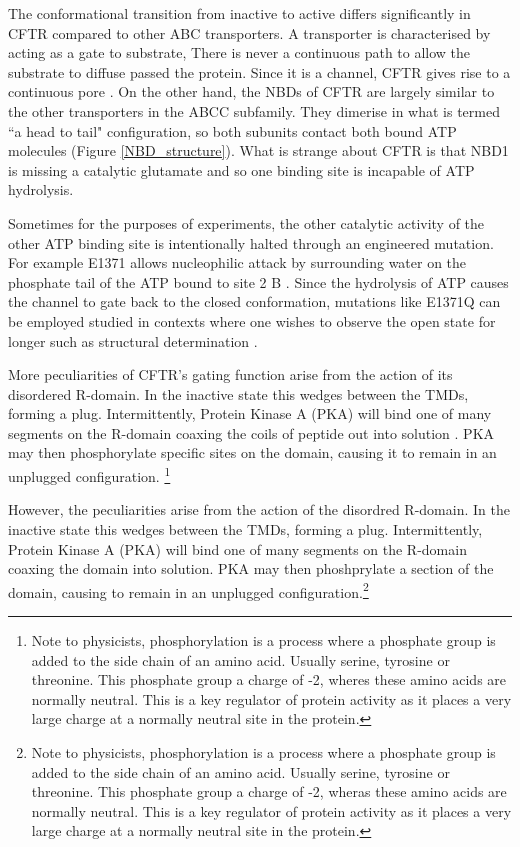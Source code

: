 The conformational transition from inactive to active differs significantly in CFTR compared to other ABC transporters. A transporter is characterised by acting as a gate to substrate, There is never a continuous path to allow the substrate to diffuse passed the protein. Since it is a channel, CFTR gives rise to a continuous pore \cite{linsdell2018}. On the  other hand, the NBDs of CFTR are largely similar to the other transporters in the ABCC subfamily. They dimerise in what is termed ``a head to tail" configuration, so both subunits contact both bound ATP molecules \cite{gout2012}  (Figure \ref{NBD_structure}). What is strange about CFTR is that NBD1 is missing a catalytic glutamate and so one binding site is incapable of ATP hydrolysis. 

Sometimes for the purposes of experiments, the other catalytic activity of the other ATP binding site is intentionally halted through an engineered mutation. For example E1371 allows nucleophilic attack by surrounding water on the phosphate tail of the ATP bound to site 2 B \cite{stratford2007}. Since the hydrolysis of ATP causes the channel to gate back to the closed conformation, mutations like E1371Q can be employed studied in contexts where one wishes to observe the open state for longer such as structural determination \cite{ramjeesingh1999, gout2012, muallem2009, hwang2013, zhang2018}. 

More peculiarities of CFTR's gating function arise from the action of its disordered R-domain. In the inactive state this wedges between the TMDs, forming a plug. Intermittently, Protein Kinase A (PKA) will bind one of many segments on the R-domain coaxing the coils of peptide out into solution \cite{mihalyi2020}. PKA may then phosphorylate specific sites on the domain, causing it to remain in an unplugged configuration. \footnote{Note to physicists, phosphorylation is a process where a phosphate group is added to the side chain of an amino acid. Usually serine, tyrosine or threonine. This phosphate group a charge of -2, wheres these amino acids are normally neutral. This is a key regulator of protein activity as it places a very large charge at a normally neutral site in the protein.}

However, the peculiarities arise from the action of the disordred R-domain. In the inactive state this wedges between the TMDs, forming a plug. Intermittently, Protein Kinase A (PKA) will bind one of many segments on the R-domain coaxing the domain into solution. PKA may then phoshprylate a section of the domain, causing to remain in an unplugged configuration.\footnote{Note to physicists, phosphorylation is a process where a phosphate group is added to the side chain of an amino acid. Usually serine, tyrosine or threonine. This phosphate group a charge of -2, wheras these amino acids are normally neutral. This is a key regulator of protein activity as it places a very large charge at a normally neutral site in the protein.}

